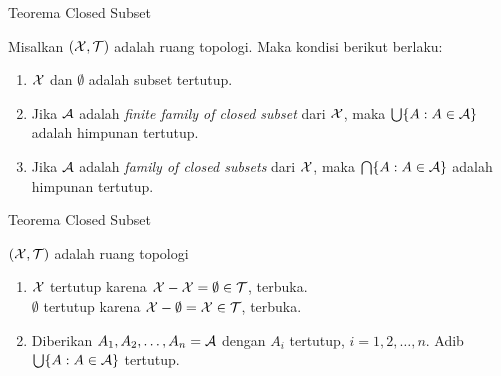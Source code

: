 \begin{frame}{Teorema Closed Subset}
    \begin{tcolorbox}[enhanced,title=Teorema 1.18, frame style tile={width=\paperwidth}{\wallpaper}]
        Misalkan $(\mathcal{X},\mathcal{T})$ adalah ruang topologi. Maka kondisi berikut berlaku:
        \begin{enumerate}
            \item $\mathcal{X}$ dan $\emptyset  $ adalah subset tertutup.
            \item Jika $\mathcal{A}$ adalah \textit{finite family of closed subset} dari $\mathcal{X}$, maka
            $\bigcup\{A:A\in\mathcal{A}\}$ adalah himpunan tertutup.
            \item Jika $\mathcal{A}$ adalah \textit{family of closed subsets} dari $\mathcal{X}$, maka
            $\bigcap\{A:A\in\mathcal{A}\}$ adalah himpunan tertutup.
        \end{enumerate}
    \end{tcolorbox}
\end{frame}

\begin{frame}{Teorema Closed Subset}
    \begin{tcolorbox}[enhanced,title=Teorema 1.18 (Bukti), frame style tile={width=\paperwidth}{\wallpaper}]
        $(\mathcal{X},\mathcal{T})$ adalah ruang topologi
        \begin{enumerate}
            \item $\mathcal{X}$ tertutup karena $\mathcal{X}-\mathcal{X} = \emptyset \in \mathcal{T}$, terbuka.\\
            $\emptyset$ tertutup karena $\mathcal{X}-\emptyset = \mathcal{X} \in \mathcal{T}$, terbuka.
            \item Diberikan ${A_1,A_2,\dots,A_n}=\mathcal{A}$ dengan $A_i$ tertutup, $i=1,2,\dots,n$.
            Adib $\bigcup\{A:A\in\mathcal{A}\}$ tertutup.
        \end{enumerate}
    \end{tcolorbox}
\end{frame}

